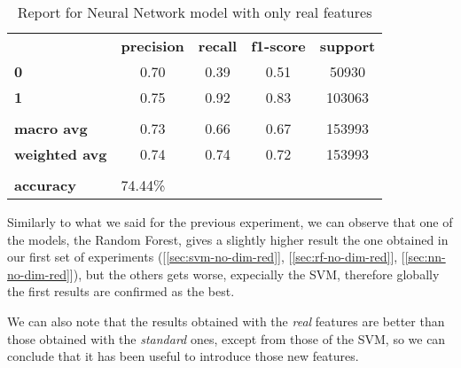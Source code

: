\begin{table}[h!]
    \centering
    \begin{tabular}{lcccc}
        \rowcolor[HTML]{EEEEEE} 
        \cellcolor[HTML]{FBFBFB} & \textbf{precision} & \textbf{recall} & \textbf{f1-score} & \textbf{support} \\
        \rowcolor[HTML]{EEEEEE} 
        \textbf{0}               & 0.70               & 0.39            & 0.51              & 50930            \\
        \rowcolor[HTML]{EEEEEE} 
        \textbf{1}               & 0.75               & 0.92            & 0.83              & 103063           \\
        \rowcolor[HTML]{FBFBFB} 
        &                    &                 &                   &                  \\
        \rowcolor[HTML]{EEEEEE} 
        \textbf{macro avg}       & 0.73               & 0.66            & 0.67              & 153993           \\
        \rowcolor[HTML]{EEEEEE} 
        \textbf{weighted avg}    & 0.74               & 0.74            & 0.72              & 153993           \\
        \rowcolor[HTML]{FBFBFB} 
        &                    &                 &                   &                  \\
        \rowcolor[HTML]{EEEEEE} 
        \textbf{accuracy}        & \multicolumn{4}{l}{\cellcolor[HTML]{EEEEEE}74.44\%}                         
    \end{tabular}
    \caption{Report for Neural Network model with only real features}
    \label{tab:nn-res-real}
\end{table}

Similarly to what we said for the previous experiment, we can observe that one of the models, the Random Forest, gives a slightly higher result \wrt the one obtained in our first set of experiments ([\ref{sec:svm-no-dim-red}], [\ref{sec:rf-no-dim-red}], [\ref{sec:nn-no-dim-red}]), but the others gets worse, expecially the SVM, therefore globally the first results are confirmed as the best.

We can also note that the results obtained with the \textit{real} features are better than those obtained with the \textit{standard} ones, except from those of the SVM, so we can conclude that it has been useful to introduce those new features.
